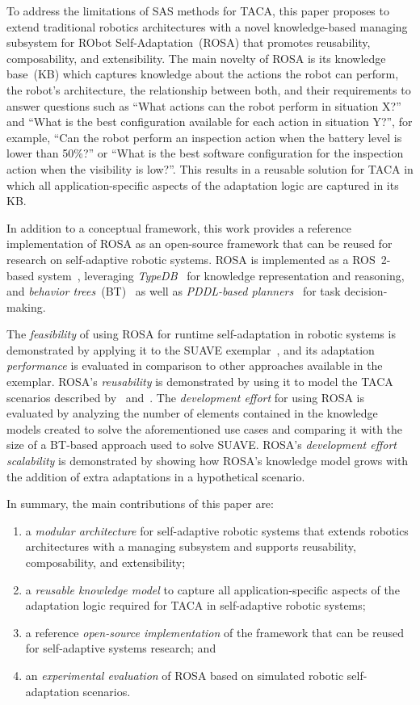 To address the limitations of SAS methods for TACA, this paper proposes to extend traditional robotics architectures with a novel knowledge-based managing subsystem for RObot Self-Adaptation~(ROSA) that promotes reusability, composability, and extensibility. The main novelty of ROSA is its knowledge base~(KB) which captures
knowledge about the actions the robot can perform, the robot's architecture, the relationship between both, and their requirements to answer questions such as ``What actions can the robot perform in situation X?'' and  ``What is the best configuration available for each action in situation Y?'', for example, ``Can the robot perform an inspection action when the battery level is lower than 50\%?'' or ``What is the best software configuration for the inspection action when the visibility is low?''. %
This results in a reusable solution for TACA in which all application-specific aspects of the adaptation logic are captured in its KB\@.

In addition to a conceptual framework, this work provides a reference implementation of ROSA as an open-source framework that can be reused for research on self-adaptive robotic systems.  ROSA is implemented as a ROS~2-based system~\cite{ros2}, leveraging \emph{TypeDB}~\citep{dorn2023type, typeql} for knowledge representation and reasoning, and \emph{behavior trees}~(BT)~\citep{colledanchise2018behavior} as well as \emph{PDDL-based planners}~\citep{pddl} for task decision-making.

The \emph{feasibility} of using ROSA for runtime self-adaptation in robotic systems is demonstrated by applying it to the SUAVE exemplar~\citep{suave}, and its adaptation \emph{performance} is evaluated in comparison to other approaches available in the exemplar. ROSA's \emph{reusability} is demonstrated by using it to model the TACA scenarios described by~\cite{braberman2018extended} and~\cite{CAMARASoftwareArchitectureTask2020}.
The \emph{development effort} for using ROSA is evaluated by analyzing the number of elements contained in the knowledge models created to solve the aforementioned use cases and comparing it with the size of a BT-based approach used to solve SUAVE\@. ROSA's \emph{development effort scalability} is demonstrated by showing how ROSA's knowledge model grows with the addition of extra adaptations in a hypothetical scenario.

In summary, the main contributions of this paper are:
\begin{enumerate}
\item a \emph{modular architecture} for self-adaptive robotic systems that extends robotics architectures with a managing subsystem and supports reusability, composability, and extensibility;
\item a \emph{reusable knowledge model} to capture all application-specific aspects of the adaptation logic required for TACA in self-adaptive robotic systems;
\item a reference \emph{open-source implementation} of the framework that can be reused for self-adaptive systems research; and
\item an \emph{experimental evaluation} of ROSA based on simulated robotic self-adaptation scenarios.
\end{enumerate}

